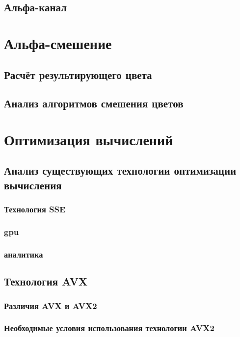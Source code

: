 \subsection{Альфа-канал}

\section{Альфа-смешение}

\subsection{Расчёт результирующего цвета}

\subsection{Анализ  алгоритмов смешения цветов}
\subsection{}
\section{Оптимизация вычислений}
\subsection{Анализ существующих технологии оптимизации вычисления}
\subsubsection{Технология SSE}
\subsubsection{gpu}
\subsubsection{аналитика}
\subsection{Технология AVX}
\subsubsection{Различия AVX и AVX2}
\subsubsection{Необходимые условия использования технологии AVX2}
